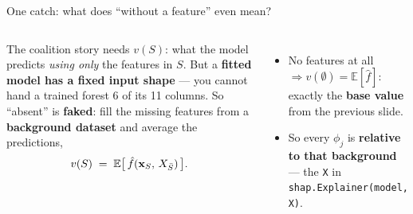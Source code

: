 \documentclass[aspectratio=169]{beamer}
\begin{document}
\begin{frame}{One catch: what does ``without a feature'' even mean?}
  \begin{columns}[T]
    The coalition story needs $v(S)$: what the model predicts \emph{using only} the features in
    $S$. But a \textbf{fitted model has a fixed input shape} --- you cannot hand a trained forest
    6 of its 11 columns.
    \vskip 3pt
    So ``absent'' is \textbf{faked}: fill the missing features from a \textbf{background dataset}
    and average the predictions,
    \[ v(S) \;=\; \mathbb{E}\big[\,\hat f(\mathbf{x}_S,\, X_{\bar S})\,\big]. \]
    \begin{itemize}\footnotesize
      \item No features at all $\Rightarrow v(\emptyset) = \mathbb{E}[\hat f]$: exactly the
        \textbf{base value} from the previous slide.
      \item So every $\phi_j$ is \textbf{relative to that background} --- the \texttt{X} in
        \texttt{shap.Explainer(model, X)}.
    \end{itemize}
    \vskip 8pt
  \end{columns}
\end{frame}
\end{document}
